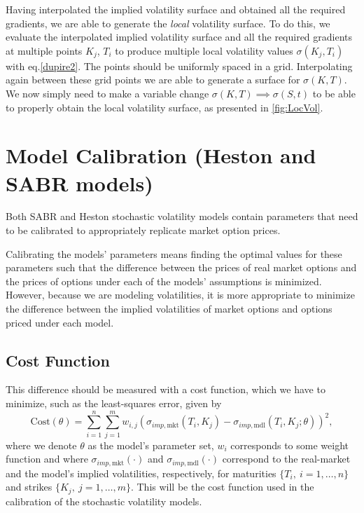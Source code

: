  
Having interpolated the implied volatility surface and obtained all the required gradients, we are able to generate the \emph{local} volatility surface. To do this, we evaluate the interpolated implied volatility surface and all the required gradients at multiple points $K_j$, $T_i$ to produce multiple local volatility values $\sigma(K_j,T_i)$ with eq.\eqref{dupire2}. The points should be uniformly spaced in a grid.
Interpolating again between these grid points we are able to generate a surface for $\sigma(K,T)$. We now simply need to make a variable change $\sigma(K,T)\implies \sigma(S,t)$ to be able to properly obtain the local volatility surface, as presented in \autoref{fig:LocVol}.


\section{Model Calibration (Heston and SABR models)}
\label{section:Model Calibration}
Both SABR and Heston stochastic volatility models contain parameters that need to be calibrated to appropriately replicate market option prices.


Calibrating the models' parameters means finding the optimal values for these parameters such that the difference between the prices of real market options and the prices of options under each of the models' assumptions is minimized. However, because we are modeling volatilities, it is more appropriate to minimize the difference between the implied volatilities of market options and options priced under each model.

\subsection{Cost Function}
This difference should be measured with a cost function, which we have to minimize, such as the least-squares error, given by
\begin{equation}\label{cost}
\boxed{\mathrm{Cost}(\theta)=\sum_{i=1}^n\sum_{j=1}^mw_{i,j}\left(\sigma_{imp,\mathrm{mkt}}(T_i,K_j)-\sigma_{imp,\mathrm{mdl}}(T_i,K_j;\theta)\right)^2,}
\end{equation}
\noindent where we denote $\theta$ as the model's parameter set, $w_i$ corresponds to some weight function and where $\sigma_{imp,\mathrm{mkt}}(\cdot)$ and $\sigma_{imp,\mathrm{mdl}}(\cdot)$ correspond to the real-market and the model's implied volatilities, respectively, for maturities $\{T_i,\ i=1,\ldots,n\}$ and strikes $\{K_j,\ j=1,\ldots,m\}$. This will be the cost function used in the calibration of the stochastic volatility models.


